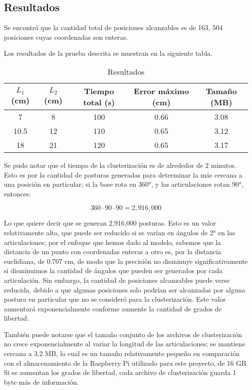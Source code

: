 \subsection{Resultados}

Se encontró que la cantidad total de posiciones alcanzables es de 163, 504 posiciones cuyas coordenadas son enteras.

Los resultados de la prueba descrita se muestran en la siguiente tabla.

\begin{table}[ht]
	\centering
	\begin{tabular}{|c|c|c|c|c|}
		\hline
		\textbf{$L_1$ (cm)} & \textbf{$L_2$ (cm)} & \textbf{Tiempo total (s)} & \textbf{Error máximo (cm)} & \textbf{Tamaño (MB)} \\
		\hline
		7 & 8 & 100 & 0.66 & 3.08 \\
		10.5 & 12 & 110 & 0.65 & 3.12 \\
		18 & 21 & 120 & 0.65 & 3.17 \\
		\hline
	\end{tabular}
	\caption{Resultados}
\end{table}

Se pudo notar que el tiempo de la clusterización es de alrededor de 2 minutos. Esto es por la cantidad de posturas generadas para determinar la más cercana a una posición en particular; si la base rota en 360°, y las articulaciones rotan 90°, entonces:

\begin{equation}
	360 \cdot 90 \cdot 90 = 2,916,000
\end{equation}

Lo que quiere decir que se generan 2,916,000 posturas. Esto es un valor relativamente alto, que puede ser reducido si se varían en ángulos de 2° en las articulaciones; por el enfoque que hemos dado al modelo, sabemos que la distancia de un punto con coordenadas enteras a otro es, por la distancia euclidiana, de 0.707 cm, de modo que la precisión no disminuye significativamente si disminuimos la cantidad de ángulos que pueden ser generados por cada articulación. Sin embargo, la cantidad de posiciones alcanzables puede verse reducida, debido a que algunas posiciones solo podrían ser alcanzadas por alguna postura en particular que no se consideró para la clusterización. Este valor aumentará exponencialmente conforme aumente la cantidad de grados de libertad.

También puede notarse que el tamaño conjunto de los archivos de clusterización no crece exponencialmente al variar la longitud de las articulaciones; se mantiene cercana a 3,2 MB, lo cual es un tamaño relativamente pequeño en comparación con el almacenamiento de la Raspberry Pi utilizado para este proyecto, de 16 GB. Si se aumentan los grados de libertad, cada archivo de clusterización guarda 1 byte más de información.
